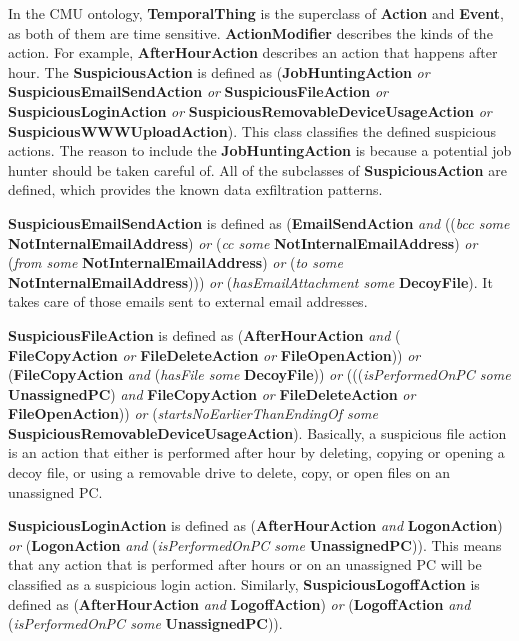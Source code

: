 In the CMU ontology, \textbf{TemporalThing} is the superclass of \textbf{Action} and 
\textbf{Event}, as both of them are time sensitive. 
\textbf{ActionModifier} describes the kinds of the action. 
For example, \textbf{AfterHourAction} describes an action that happens after hour. 
The \textbf{SuspiciousAction} is defined as (\textbf{JobHuntingAction} \textit{or} \textbf{SuspiciousEmailSendAction} \textit{or} \textbf{SuspiciousFileAction} \textit{or} \textbf{SuspiciousLoginAction} \textit{or} \textbf{SuspiciousRemovableDeviceUsageAction} \textit{or} \textbf{SuspiciousWWWUploadAction}). 
This class classifies the defined suspicious actions. 
The reason to include the \textbf{JobHuntingAction} is because a potential job hunter should be taken careful of. 
All of the subclasses of \textbf{SuspiciousAction} are defined, which provides the known data exfiltration patterns. 

\textbf{SuspiciousEmailSendAction} is defined as (\textbf{EmailSendAction} \textit{and} ((\textit{bcc some} \textbf{NotInternalEmailAddress}) \textit{or} (\textit{cc some} \textbf{NotInternalEmailAddress}) \textit{or} (\textit{from some} \textbf{NotInternalEmailAddress}) \textit{or} (\textit{to some} \textbf{NotInternalEmailAddress}))) \textit{or} (\textit{hasEmailAttachment some} \textbf{DecoyFile}).
It takes care of those emails sent to external email addresses. 

\textbf{SuspiciousFileAction} is defined as (\textbf{AfterHourAction} \textit{and} ( \textbf{FileCopyAction} \textit{or} \textbf{FileDeleteAction} \textit{or} \textbf{FileOpenAction})) \textit{or} (\textbf{FileCopyAction} \textit{and} (\textit{hasFile some} \textbf{DecoyFile})) \textit{or} (((\textit{isPerformedOnPC some} \textbf{UnassignedPC}) \textit{and} \textbf{FileCopyAction} \textit{or} \textbf{FileDeleteAction} \textit{or}  \textbf{FileOpenAction})) \textit{or} (\textit{startsNoEarlierThanEndingOf some} \textbf{SuspiciousRemovableDeviceUsageAction}). 
Basically, a suspicious file action is an action that either is performed after hour by deleting, copying or opening a decoy file, or using a removable drive to delete, copy, or open files on an unassigned PC. 

\textbf{SuspiciousLoginAction} is defined as (\textbf{AfterHourAction} \textit{and} \textbf{LogonAction}) \textit{or} (\textbf{LogonAction} \textit{and} (\textit{isPerformedOnPC some} \textbf{UnassignedPC})).
This means that any action that is performed after hours or on an unassigned PC will be classified as a suspicious login action. 
Similarly, \textbf{SuspiciousLogoffAction} is defined as (\textbf{AfterHourAction} \textit{and} \textbf{LogoffAction}) \textit{or} (\textbf{LogoffAction} \textit{and} (\textit{isPerformedOnPC some} \textbf{UnassignedPC})).

